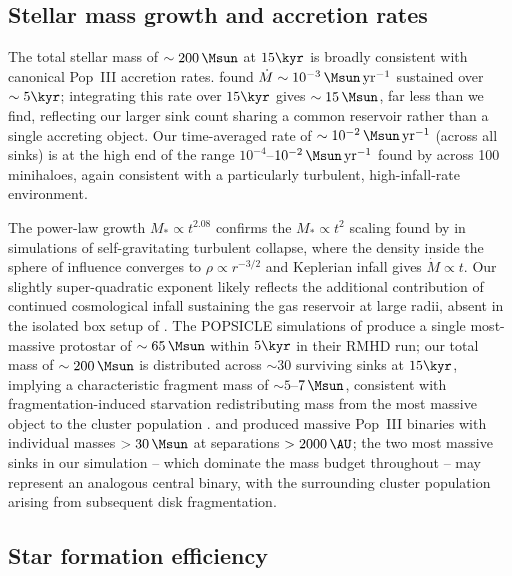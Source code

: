 \subsection*{Stellar mass growth and accretion rates}

The total stellar mass of $\sim 200\,\Msun$ at $15\kyr$ is broadly
consistent with canonical Pop~III accretion rates.
\citet{stacy10} found $\dot{M} \sim 10^{-3}\,\Msun\,\mathrm{yr}^{-1}$
sustained over $\sim 5\kyr$; integrating this rate over $15\kyr$
gives $\sim 15\,\Msun$, far less than we find, reflecting our larger
sink count sharing a common reservoir rather than a single accreting
object.
Our time-averaged rate of $\sim 10^{-2}\,\Msun\,\mathrm{yr}^{-1}$
(across all sinks) is at the high end of the range
$10^{-4}$--$10^{-2}\,\Msun\,\mathrm{yr}^{-1}$ found by
\citet{hirano14} across 100 minihaloes, again consistent with a
particularly turbulent, high-infall-rate environment.

The power-law growth $M_* \propto t^{2.08}$ confirms the
$M_* \propto t^2$ scaling found by \citet{murray16} in simulations of
self-gravitating turbulent collapse, where the density inside the
sphere of influence converges to $\rho \propto r^{-3/2}$ and
Keplerian infall gives $\dot{M} \propto t$.
Our slightly super-quadratic exponent likely reflects the additional
contribution of continued cosmological infall sustaining the gas
reservoir at large radii, absent in the isolated box setup of
\citet{murray16}.
The POPSICLE simulations of \citet{sharda_menon25} produce a single
most-massive protostar of $\sim 65\,\Msun$ within $5\kyr$ in their
RMHD run; our total mass of $\sim 200\,\Msun$ is distributed across
$\sim 30$ surviving sinks at $15\kyr$, implying a characteristic
fragment mass of $\sim 5$--$7\,\Msun$, consistent with
fragmentation-induced starvation redistributing mass from the most
massive object to the cluster population \citep{prole22}.
\citet{sugimura20} and \citet{sugimura23} produced massive Pop~III
binaries with individual masses $>30\,\Msun$ at separations
$>2000\,\AU$; the two most massive sinks in our simulation -- which
dominate the mass budget throughout -- may represent an analogous
central binary, with the surrounding cluster population arising
from subsequent disk fragmentation.

\subsection*{Star formation efficiency}

